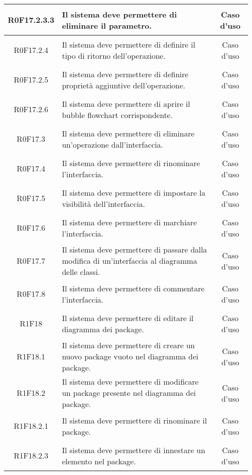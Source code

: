 \documentclass[../AnalisiDeiRequisiti.tex]{subfiles}
\begin{document}
\begin{longtable}{|c|>{\centering}p{7cm}|c|}
\hypertarget{R0F17.2.3.3}{R0F17.2.3.3} & Il sistema deve permettere di eliminare il parametro. & Caso d'uso \\ \hline
\hypertarget{R0F17.2.4}{R0F17.2.4} & Il sistema deve permettere di definire il tipo di ritorno dell'operazione. & Caso d'uso \\ \hline
\hypertarget{R0F17.2.5}{R0F17.2.5} & Il sistema deve permettere di definire proprietà aggiuntive dell'operazione. & Caso d'uso \\ \hline
\hypertarget{R0F17.2.6}{R0F17.2.6} & Il sistema deve permettere di aprire il bubble flowchart corrispondente. & Caso d'uso \\ \hline
\hypertarget{R0F17.3}{R0F17.3} & Il sistema deve permettere di eliminare un'operazione dall'interfaccia. 

& Caso d'uso \\ \hline
\hypertarget{R0F17.4}{R0F17.4} & Il sistema deve permettere di rinominare l'interfaccia. & Caso d'uso \\ \hline
\hypertarget{R0F17.5}{R0F17.5} & Il sistema deve permettere di impostare la visibilità dell'interfaccia. & Caso d'uso \\ \hline
\hypertarget{R0F17.6}{R0F17.6} & Il sistema deve permettere di marchiare l'interfaccia. & Caso d'uso \\ \hline
\hypertarget{R0F17.7}{R0F17.7} & Il sistema deve permettere di passare dalla modifica di un'interfaccia al diagramma delle classi. & Caso d'uso \\ \hline
\hypertarget{R0F17.8}{R0F17.8} & Il sistema deve permettere di commentare l'interfaccia. & Caso d'uso \\ \hline
\hypertarget{R1F18}{R1F18} & Il sistema deve permettere di editare il diagramma dei package. & Caso d'uso \\ \hline
\hypertarget{R1F18.1}{R1F18.1} & Il sistema deve permettere di creare un nuovo package vuoto nel diagramma dei package. & Caso d'uso \\ \hline
\hypertarget{R1F18.2}{R1F18.2} & Il sistema deve permettere di modificare un package presente nel diagramma dei package. & Caso d'uso \\ \hline
\hypertarget{R1F18.2.1}{R1F18.2.1} & Il sistema deve permettere di rinominare il package. & Caso d'uso \\ \hline
\hypertarget{R1F18.2.3}{R1F18.2.3} & Il sistema deve permettere di innestare un elemento nel package. & Caso d'uso \\ \hline

\end{longtable}
\end{document}
